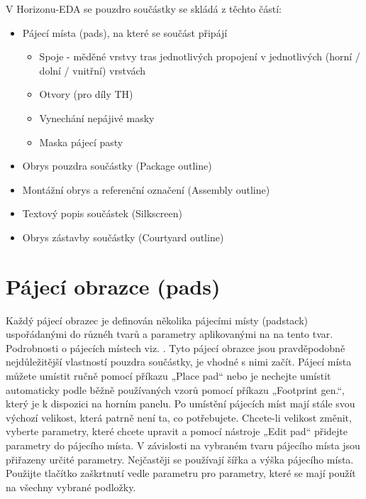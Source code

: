 \documentclass[letterpaper,10pt,czech]{sphinxmanual}
\begin{document}
V Horizonu-EDA se pouzdro součástky se skládá z těchto částí:
\begin{itemize}
\item {} 
Pájecí místa (pads), na které se součást připájí
\begin{itemize}
\item {} 
Spoje - měděné vrstvy tras jednotlivých propojení v jednotlivých (horní / dolní / vnitřní) vrstvách

\item {} 
Otvory (pro díly TH)

\item {} 
Vynechání nepájivé masky

\item {} 
Maska pájecí pasty

\end{itemize}

\item {} 
Obrys pouzdra součástky (Package outline)

\item {} 
Montážní obrys a referenční označení (Assembly outline)

\item {} 
Textový popis součástek (Silkscreen)

\item {} 
Obrys zástavby součástky (Courtyard outline)

\end{itemize}


\section{Pájecí obrazce (pads)}
\label{\detokenize{create-package:pajeci-obrazce-pads}}
Každý pájecí obrazec je definován několika pájecími místy (padstack) uspořádanými do různéh tvarů a parametry aplikovanými na na tento tvar. Podrobnosti o pájecích místech viz.
{\hyperref[\detokenize{padstacks::doc}]{}}. Tyto pájecí obrazce jsou pravděpodobně nejdůležitější vlastností pouzdra součástky, je vhodné s nimi začít. Pájecí místa můžete umístit ručně pomocí příkazu „Place pad“ nebo je nechejte umístit automaticky podle běžně používaných vzorů pomocí příkazu „Footprint gen.“, který je k dispozici na horním panelu. Po umístění pájecích míst mají stále svou výchozí velikost, která patrně není ta, co potřebujete. Chcete-li velikost změnit, vyberte parametry, které chcete upravit a pomocí nástroje „Edit pad“ přidejte parametry do pájecího místa. V závislosti na vybraném tvaru pájecího místa jsou přiřazeny určité parametry. Nejčastěji se používají šířka a výška pájecího místa. Použijte tlačítko zaškrtnutí vedle parametru pro parametry, které se mají použít na všechny vybrané podložky.
\end{document}
